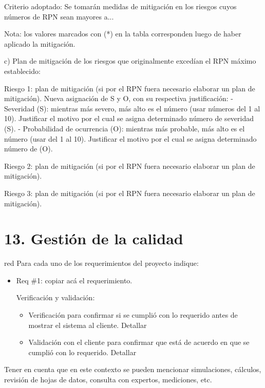 \documentclass[11pt]{charter}
\begin{document}
Criterio adoptado: 
Se tomarán medidas de mitigación en los riesgos cuyos números de RPN sean mayores a...

Nota: los valores marcados con (*) en la tabla corresponden luego de haber aplicado la mitigación.

c) Plan de mitigación de los riesgos que originalmente excedían el RPN máximo establecido:
 
Riesgo 1: plan de mitigación (si por el RPN fuera necesario elaborar un plan de mitigación).
  Nueva asignación de S y O, con su respectiva justificación:
  - Severidad (S): mientras más severo, más alto es el número (usar números del 1 al 10).
          Justificar el motivo por el cual se asigna determinado número de severidad (S).
  - Probabilidad de ocurrencia (O): mientras más probable, más alto es el número (usar del 1 al 10).
          Justificar el motivo por el cual se asigna determinado número de (O).

Riesgo 2: plan de mitigación (si por el RPN fuera necesario elaborar un plan de mitigación).
 
Riesgo 3: plan de mitigación (si por el RPN fuera necesario elaborar un plan de mitigación).



\section{13. Gestión de la calidad}
\label{sec:calidad}

\begin{consigna}{red}
Para cada uno de los requerimientos del proyecto indique:
\begin{itemize} 
\item Req \#1: copiar acá el requerimiento.

Verificación y validación:

\begin{itemize}
\item Verificación para confirmar si se cumplió con lo requerido antes de mostrar el sistema al cliente. Detallar 
\item Validación con el cliente para confirmar que está de acuerdo en que se cumplió con lo requerido. Detallar  
\end{itemize}

\end{itemize}

Tener en cuenta que en este contexto se pueden mencionar simulaciones, cálculos, revisión de hojas de datos, consulta con expertos, mediciones, etc.

\end{consigna}
\end{document}
